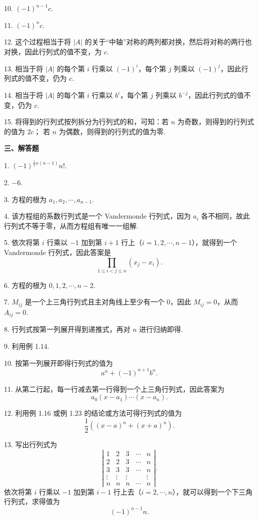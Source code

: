 \documentclass[UTF8, 12pt, fontset=fandol, oneside]{ctexart}
\begin{document}
10. $(-1)^{n-1}c$.

11. $(-1)^nc$.

12. 这个过程相当于将 $|A|$ 的关于“中轴”对称的两列都对换，然后将对称的两行也对换，因此行列式的值不变，为 $c$.

13. 相当于将 $|A|$ 的每个第 $i$ 行乘以 $(-1)^i$，每个第 $j$ 列乘以 $(-1)^j$，因此行列式的值不变，仍为 $c$.

14. 相当于将 $|A|$ 的每个第 $i$ 行乘以 $b^i$，每个第 $j$ 列乘以 $b^{-j}$，因此行列式的值不变，仍为 $c$.

15. 将得到的行列式按列拆分为行列式的和，可知：若 $n$ 为奇数，则得到的行列式的值为 $2c$；
若 $n$ 为偶数，则得到的行列式的值为零.

\noindent\textbf{三、解答题}

1. $(-1)^{\frac12n(n-1)}n!$.

2. $-6$.

3. 方程的根为 $a_1,a_2,\cdots,a_{n-1}$.

4. 该方程组的系数行列式是一个 Vandermonde 行列式，因为 $a_i$ 各不相同，故此行列式不等于零，从而方程组有唯一一组解.

5. 依次将第 $i$ 行乘以 $-1$ 加到第 $i+1$ 行上（$i=1,2,\cdots,n-1$），就得到一个 Vandermonde 行列式，因此答案是
\[
\prod_{1\le i<j\le n}(x_j-x_i).
\]

6. 方程的根为 $0,1,2,\cdots,n-2$.

7. $M_{ij}$ 是一个上三角行列式且主对角线上至少有一个 $0$，因此 $M_{ij}=0$，从而 $A_{ij}=0$.

8. 行列式按第一列展开得到递推式，再对 $n$ 进行归纳即得.

9. 利用例 1.14.

10. 按第一列展开即得行列式的值为
\[
a^n+(-1)^{n+1}b^n.
\]

11. 从第二行起，每一行减去第一行得到一个上三角行列式，因此答案为
\[
a_0(x-a_1)\cdots(x-a_n).
\]

12. 利用例 1.16 或例 1.23 的结论或方法可得行列式的值为
\[
\frac12\left((x-a)^n+(x+a)^n\right).
\]

13. 写出行列式为
\[
\left|\begin{array}{ccccc}
1&2&3&\cdots&n\\
2&2&3&\cdots&n\\
3&3&3&\cdots&n\\
\vdots&\vdots&\vdots&&\vdots\\
n&n&n&\cdots&n
\end{array}\right|.
\]
依次将第 $i$ 行乘以 $-1$ 加到第 $i-1$ 行上去（$i=2,\cdots,n$），就可以得到一个下三角行列式，求得值为
\[
(-1)^{n-1}n.
\]
\end{document}
